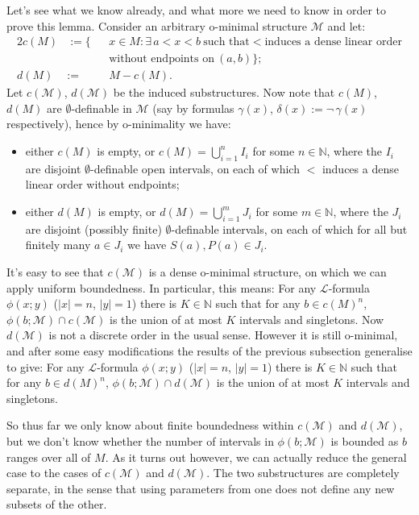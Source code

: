 \documentclass[a4paper]{report}
\newcommand{\ind}{\hspace{15pt}}
\newcommand{\Nat}{\mathbb{N}}
\renewcommand{\L}{\mathcal{L}}
\newcommand{\M}{\mathcal{M}}
\theoremstyle{definition}
\theoremstyle{remstyle}
\newenvironment{claim}[1]
{\renewcommand\theclaiminner{#1}\claiminner}
{\endclaiminner}
\begin{document}
\ind Let's see what we know already, and what more we need to know in order to prove this lemma. Consider an arbitrary o-minimal structure $\M$ and let:
\begin{alignat*}{2}
	c(M) & := \{ &  & x\in M: \exists\, a < x < b\ \text{such that} < \text{induces a dense linear order} \\ & &&\text{without endpoints on}\ (a,b)\};\\
	d(M) & :=    &  & \!\! M - c(M).
\end{alignat*}
Let $c(\M)$, $d(\M)$ be the induced substructures. Now note that $c(M)$, $d(M)$ are $\emptyset$-definable in $\M$ (say by formulas $\gamma(x)$, $\delta(x):=\neg\,\gamma(x)$ respectively), hence by o-minimality we have:
\begin{itemize}
	\item either $c(M)$ is empty, or $c(M)=\bigcup_{i=1}^n I_i$ for some $n\in\Nat$, where the $I_i$ are disjoint $\emptyset$-definable open intervals, on each of which $<$ induces a dense linear order without endpoints;
	\item either $d(M)$ is empty, or $d(M)=\bigcup_{i=1}^m J_i$ for some $m\in\Nat$, where the $J_i$ are disjoint (possibly finite) $\emptyset$-definable intervals, on each of which for all but finitely many $a\in J_i$ we have $S(a),P(a)\in J_i$.
\end{itemize}
It's easy to see that $c(\M)$ is a dense o-minimal structure, on which we can apply uniform boundedness. In particular, this means:
\begin{claim}{1}
	For any $\L$-formula $\phi(x;y)$ ($|x|=n$, $|y|=1$) there is $K\in\Nat$ such that for any $b\in c(M)^n$, $\phi(b;\M)\cap c(\M)$ is the union of at most $K$ intervals and singletons.
\end{claim}
Now $d(\M)$ is not a discrete order in the usual sense. However it is still o-minimal, and after some easy modifications the results of the previous subsection generalise to give:
\begin{claim}{2}
	For any $\L$-formula $\phi(x;y)$ ($|x|=n$, $|y|=1$) there is $K\in\Nat$ such that for any $b\in d(M)^n$, $\phi(b;\M)\cap d(\M)$ is the union of at most $K$ intervals and singletons.
\end{claim}

\ind So thus far we only know about finite boundedness within $c(\M)$ and $d(\M)$, but we don't know whether the number of intervals in $\phi(b;\M)$ is bounded as $b$ ranges over all of $M$. As it turns out however, we can actually reduce the general case to the cases of $c(\M)$ and $d(\M)$. The two substructures are completely separate, in the sense that using parameters from one does not define any new subsets of the other.
\end{document}
